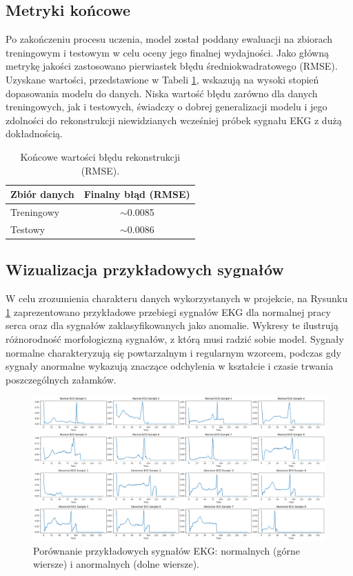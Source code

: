 \documentclass[12pt,a4paper]{article}
\begin{document}
\subsection{Metryki końcowe}

Po zakończeniu procesu uczenia, model został poddany ewaluacji na zbiorach treningowym i testowym w celu oceny jego finalnej wydajności. Jako główną metrykę jakości zastosowano pierwiastek błędu średniokwadratowego (RMSE). Uzyskane wartości, przedstawione w Tabeli \ref{tab:final_metrics}, wskazują na wysoki stopień dopasowania modelu do danych. Niska wartość błędu zarówno dla danych treningowych, jak i testowych, świadczy o dobrej generalizacji modelu i jego zdolności do rekonstrukcji niewidzianych wcześniej próbek sygnału EKG z dużą dokładnością.

\begin{table}[H]
\centering
\begin{tabular}{@{}lc@{}}
\toprule
\textbf{Zbiór danych} & \textbf{Finalny błąd (RMSE)} \\
\midrule
Treningowy & $\sim$0.0085 \\
Testowy & $\sim$0.0086 \\
\bottomrule
\end{tabular}
\caption{Końcowe wartości błędu rekonstrukcji (RMSE).}
\label{tab:final_metrics}
\end{table}

\subsection{Wizualizacja przykładowych sygnałów}

W celu zrozumienia charakteru danych wykorzystanych w projekcie, na Rysunku \ref{fig:ecg_samples} zaprezentowano przykładowe przebiegi sygnałów EKG dla normalnej pracy serca oraz dla sygnałów zaklasyfikowanych jako anomalie. Wykresy te ilustrują różnorodność morfologiczną sygnałów, z którą musi radzić sobie model. Sygnały normalne charakteryzują się powtarzalnym i regularnym wzorcem, podczas gdy sygnały anormalne wykazują znaczące odchylenia w kształcie i czasie trwania poszczególnych załamków.

\begin{figure}[H]
    \centering
    \includegraphics[width=\textwidth]{ecg_samples.png}
    \caption{Porównanie przykładowych sygnałów EKG: normalnych (górne wiersze) i anormalnych (dolne wiersze).}
    \label{fig:ecg_samples}
\end{figure}
\end{document}
